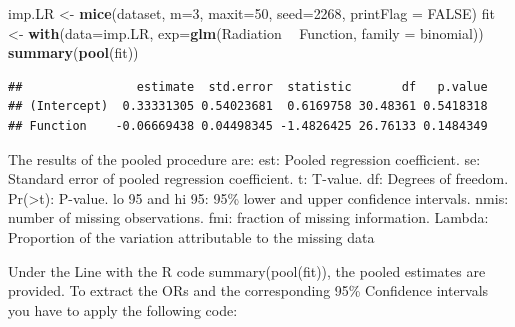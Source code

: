 \documentclass[]{book}
\newenvironment{Shaded}{\begin{snugshade}}{\end{snugshade}}
\newcommand{\KeywordTok}[1]{\textcolor[rgb]{0.13,0.29,0.53}{\textbf{#1}}}
\newcommand{\DataTypeTok}[1]{\textcolor[rgb]{0.13,0.29,0.53}{#1}}
\newcommand{\DecValTok}[1]{\textcolor[rgb]{0.00,0.00,0.81}{#1}}
\newcommand{\FloatTok}[1]{\textcolor[rgb]{0.00,0.00,0.81}{#1}}
\newcommand{\StringTok}[1]{\textcolor[rgb]{0.31,0.60,0.02}{#1}}
\newcommand{\OtherTok}[1]{\textcolor[rgb]{0.56,0.35,0.01}{#1}}
\newcommand{\OperatorTok}[1]{\textcolor[rgb]{0.81,0.36,0.00}{\textbf{#1}}}
\newcommand{\NormalTok}[1]{#1}
\begin{document}
\begin{Shaded}
\begin{Highlighting}[]
\NormalTok{imp.LR <-}\StringTok{ }\KeywordTok{mice}\NormalTok{(dataset, }\DataTypeTok{m=}\DecValTok{3}\NormalTok{, }\DataTypeTok{maxit=}\DecValTok{50}\NormalTok{, }\DataTypeTok{seed=}\DecValTok{2268}\NormalTok{, }\DataTypeTok{printFlag =} \OtherTok{FALSE}\NormalTok{)}
\NormalTok{fit <-}\StringTok{ }\KeywordTok{with}\NormalTok{(}\DataTypeTok{data=}\NormalTok{imp.LR, }\DataTypeTok{exp=}\KeywordTok{glm}\NormalTok{(Radiation }\OperatorTok{~}\StringTok{ }\NormalTok{Function, }\DataTypeTok{family =}\NormalTok{ binomial))}
\KeywordTok{summary}\NormalTok{(}\KeywordTok{pool}\NormalTok{(fit))}
\end{Highlighting}
\end{Shaded}

\begin{verbatim}
##                estimate  std.error  statistic       df   p.value
## (Intercept)  0.33331305 0.54023681  0.6169758 30.48361 0.5418318
## Function    -0.06669438 0.04498345 -1.4826425 26.76133 0.1484349
\end{verbatim}

The results of the pooled procedure are: est: Pooled regression
coefficient. se: Standard error of pooled regression coefficient. t:
T-value. df: Degrees of freedom.
Pr(\textgreater{}\textbar{}t\textbar{}): P-value. lo 95 and hi 95: 95\%
lower and upper confidence intervals. nmis: number of missing
observations. fmi: fraction of missing information. Lambda: Proportion
of the variation attributable to the missing data

Under the Line with the R code summary(pool(fit)), the pooled estimates
are provided. To extract the ORs and the corresponding 95\% Confidence
intervals you have to apply the following code:

\begin{Shaded}
\end{Shaded}
\end{document}
